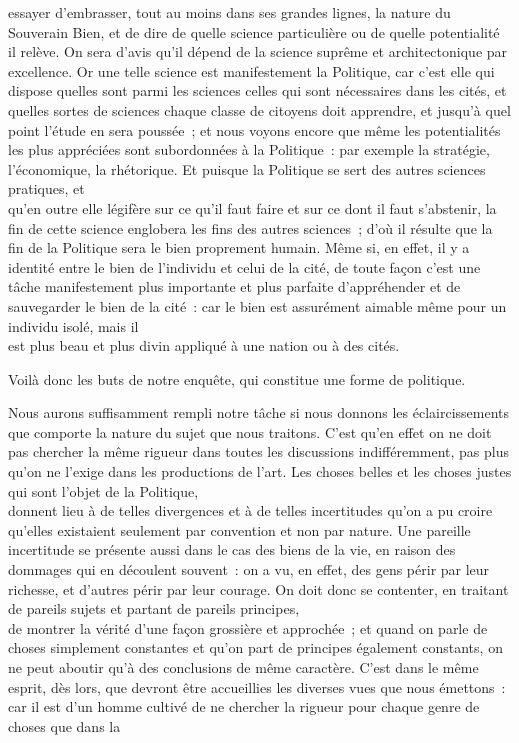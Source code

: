 \documentclass[french,twoside]{book} %
\begin{document}
essayer d’embrasser, tout au moins dans ses grandes lignes, la nature du Souverain Bien, et de dire de quelle science particulière ou de quelle potentialité il relève. On sera d’avis qu’il dépend de la science suprême et architectonique par excellence. Or une telle science est manifestement la Politique, car c’est elle qui dispose quelles sont parmi les sciences celles qui  sont nécessaires dans les cités, et quelles sortes de sciences chaque classe de citoyens doit apprendre, et jusqu’à quel point l’étude en sera poussée ; et nous voyons encore que même les potentialités les plus appréciées sont subordonnées à la Politique : par exemple la stratégie, l’économique, la rhétorique. Et puisque la Politique se sert des autres sciences pratiques, et \\
qu’en outre elle légifère sur ce qu’il faut faire et sur ce dont il faut s’abstenir, la fin de cette science englobera les fins des autres sciences ; d’où il résulte que la fin de la Politique sera le bien proprement humain. Même si, en effet, il y a identité entre le bien de l’individu et celui de la cité, de toute façon c’est une tâche manifestement plus importante et plus parfaite d’appréhender et de sauvegarder le bien de la cité : car le bien est assurément aimable même pour un individu isolé, mais il \\
est plus beau et plus divin appliqué à une nation ou à des cités.\par
Voilà donc les buts de notre enquête, qui constitue une forme de politique.\par
Nous aurons suffisamment rempli notre tâche si nous donnons les éclaircissements que comporte la nature du sujet que nous traitons. C’est qu’en effet on ne doit pas chercher la même rigueur dans toutes les discussions indifféremment, pas plus qu’on ne l’exige dans les productions de l’art. Les choses belles et les choses justes qui sont l’objet de la Politique, \\
donnent lieu à de telles divergences et à de telles incertitudes qu’on a pu croire qu’elles existaient seulement par convention et non par nature. Une pareille incertitude se présente aussi dans le cas des biens de la vie, en raison des dommages qui en découlent souvent : on a vu, en effet, des gens périr par leur richesse, et d’autres périr par leur courage. On doit donc se contenter, en traitant de pareils sujets et partant de pareils principes, \\
de montrer la vérité d’une façon grossière et approchée ; et quand on parle de choses simplement constantes et qu’on part de principes également constants, on ne peut aboutir qu’à des conclusions de même caractère. C’est dans le même esprit, dès lors, que devront être accueillies les diverses vues que nous émettons : car il est d’un homme cultivé de ne chercher la rigueur pour chaque genre de choses que dans la \\
\end{document}
